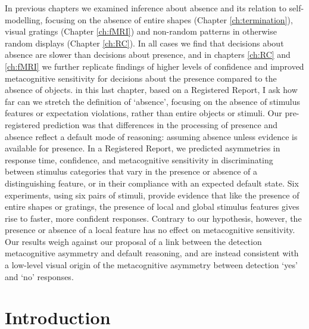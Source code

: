 \documentclass[12pt,twoside]{reedthesis}
\begin{document}
In previous chapters we examined inference about absence and its relation to self-modelling, focusing on the absence of entire shapes (Chapter \ref{ch:termination}), visual gratings (Chapter \ref{ch:fMRI}) and non-random patterns in otherwise random displays (Chapter \ref{ch:RC}). In all cases we find that decisions about absence are slower than decisions about presence, and in chapters \ref{ch:RC} and \ref{ch:fMRI} we further replicate findings of higher levels of confidence and improved metacognitive sensitivity for decisions about the presence compared to the absence of objects. in this last chapter, based on a Registered Report, I ask how far can we stretch the definition of `absence', focusing on the absence of stimulus features or expectation violations, rather than entire objects or stimuli. Our pre-registered prediction was that differences in the processing of presence and absence reflect a default mode of reasoning: assuming absence unless evidence is available for presence. In a Registered Report, we predicted asymmetries in response time, confidence, and metacognitive sensitivity in discriminating between stimulus categories that vary in the presence or absence of a distinguishing feature, or in their compliance with an expected default state. Six experiments, using six pairs of stimuli, provide evidence that like the presence of entire shapes or gratings, the presence of local and global stimulus features gives rise to faster, more confident responses. Contrary to our hypothesis, however, the presence or absence of a local feature has no effect on metacognitive sensitivity. Our results weigh against our proposal of a link between the detection metacognitive asymmetry and default reasoning, and are instead consistent with a low-level visual origin of the metacognitive asymmetry between detection `yes' and `no' responses.

\hypertarget{introduction-5}{%
\section{Introduction}\label{introduction-5}}
\end{document}
